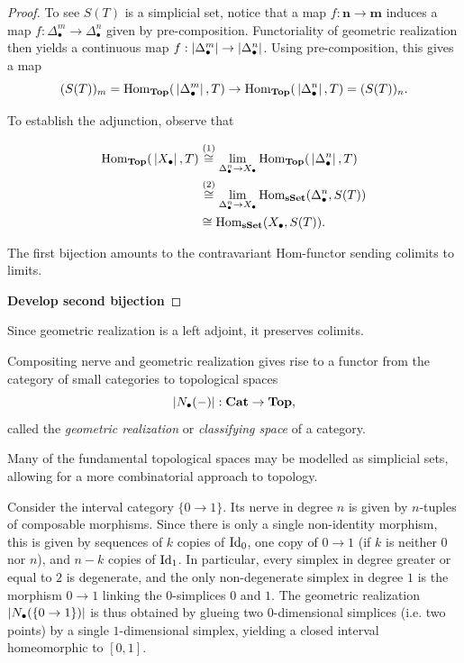 \begin{proof}
    To see $S(T)$ is a simplicial set, notice that a map $f : \textbf{n} \to \textbf{m}$ induces a map $f: \Delta^m_{\bullet} \to \Delta^n_{\bullet}$ given by pre-composition. Functoriality of geometric realization then yields a continuous map $f : \abs{\Delta^m_{\bullet}} \to \abs{\Delta^n_{\bullet}}$. Using pre-composition, this gives a map
    \[ (S(T))_m = \Hom[\Top]{\abs{\Delta^m_{\bullet}}}{T} \to \Hom[\Top]{\abs{\Delta^n_{\bullet}}}{T} = (S(T))_n . \]

    To establish the adjunction, observe that

    \begin{align*}
    \Hom[\Top]{\abs{X_{\bullet}}}{T} &\overset{(1)}{\cong} \lim_{\Delta^n_{\bullet} \to X_{\bullet}} \Hom[\Top]{\abs{\Delta^n_{\bullet}}}{T} \\
    &\overset{(2)}{\cong} \lim_{\Delta^n_{\bullet} \to X_{\bullet}} \Hom[\sSet]{\Delta^n_{\bullet}}{S(T)} \\
    &\cong \Hom[\sSet]{X_{\bullet}}{S(T)}.
    \end{align*}

    The first bijection amounts to the contravariant Hom-functor sending colimits to limits.
    
    \textbf{Develop second bijection}
\end{proof}

\begin{remark}
    Since geometric realization is a left adjoint, it preserves colimits.
\end{remark}


Compositing nerve and geometric realization gives rise to a functor from the category of small categories to topological spaces
\[ \abs{N_{\bullet}(-)} : \Cat \to \Top, \]
called the \emph{geometric realization} or \emph{classifying space} of a category.

Many of the fundamental topological spaces may be modelled as simplicial sets, allowing for a more combinatorial approach to topology. 

\begin{example}\label{example:interval}
    Consider the interval category $\{0 \to 1 \}$. Its nerve in degree $n$ is given by $n$-tuples of composable morphisms. Since there is only a single non-identity morphism, this is given by sequences of $k$ copies of $\Id{0}$, one copy of $0 \to 1$ (if $k$ is neither $0$ nor $n$), and $n - k$ copies of $\Id{1}$. In particular, every simplex in degree greater or equal to $2$ is degenerate, and the only non-degenerate simplex in degree $1$ is the morphism $0 \to 1$ linking the $0$-simplices $0$ and $1$. The geometric realization $\catreal{\{0 \to 1 \}}$ is thus obtained by glueing two $0$-dimensional simplices (i.e. two points) by a single $1$-dimensional simplex, yielding a closed interval homeomorphic to $[0,1]$.
\end{example}

